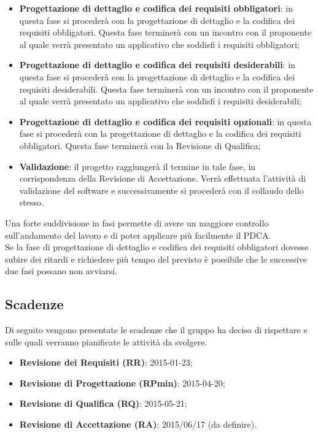 \begin{itemize}
			\item \textbf{Progettazione di dettaglio e codifica dei requisiti obbligatori}: in questa fase si procederà con la progettazione di dettaglio e la codifica dei requisiti obbligatori. Questa fase terminerà con un incontro con il proponente al quale verrà presentato un applicativo che soddisfi i requisiti obbligatori;
			
			\item \textbf{Progettazione di dettaglio e codifica dei requisiti desiderabili}: in questa fase si procederà con la progettazione di dettaglio e la codifica dei requisiti desiderabili. Questa fase terminerà con un incontro con il proponente al quale verrà presentato un applicativo che soddisfi i requisiti desiderabili;
			
			\item \textbf{Progettazione di dettaglio e codifica dei requisiti opzionali}: in questa fase si procederà con la progettazione di dettaglio e la codifica dei requisiti obbligatori. Questa fase terminerà con la Revisione di Qualifica;
			
			\item \textbf{Validazione}: il progetto raggiungerà il termine in tale fase, in corrispondenza della Revisione di Accettazione. Verrà effettuata l’attività di validazione del software e successivamente si procederà con il collaudo dello stesso.
		\end{itemize}
\noindent
	Una forte suddivisione in fasi permette di avere un maggiore controllo sull'andamento del lavoro e di poter applicare più facilmente il PDCA. \\
	Se la fase di progettazione di dettaglio e codifica dei requisiti obbligatori dovesse subire dei ritardi e richiedere più tempo del previsto è possibile che le successive due fasi possano non avviarsi.

	\subsection{Scadenze}
	Di seguito vengono presentate le scadenze che il gruppo \groupName{} ha deciso di rispettare e sulle quali verranno pianificate le attività da svolgere.
		\begin{itemize}
			\item \textbf{Revisione dei Requisiti (RR)}: 2015-01-23;
			\item \textbf{Revisione di Progettazione (RPmin)}: 2015-04-20;
			\item \textbf{Revisione di Qualifica (RQ)}: 2015-05-21;
			\item \textbf{Revisione di Accettazione (RA)}: 2015/06/17 (da definire).
		\end{itemize}